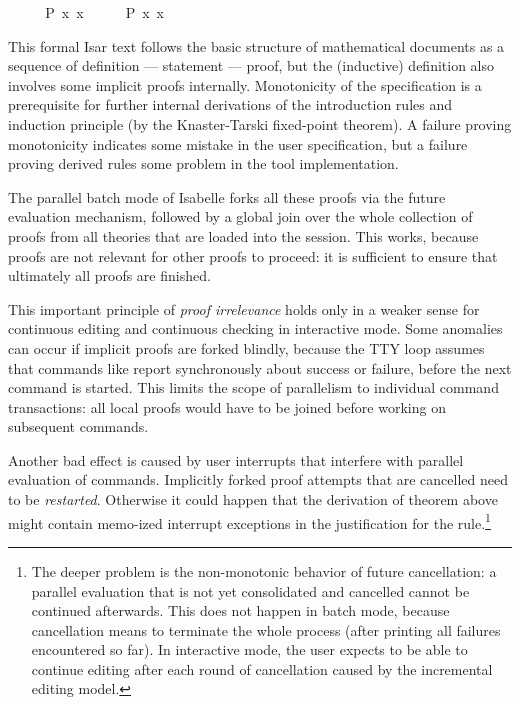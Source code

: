 \begin{isabellebody}
\ \ \isamarkupfalse%
\ \isamarkupfalse%
\ {\isacharbackquoteopen}P\ x\ x\isanewline
\ \ \isamarkupfalse%
\ \isamarkupfalse%
\ {\isachardoublequoteopen}P\ x\ x\ \isamarkupfalse%
\ \ %
\isanewline
{}\isamarkupfalse%
%
\endisatagproof
{\isafoldproof}%
%
\isadelimproof
%
\endisadelimproof
%
\begin{isamarkuptext}%
\noindent This formal Isar text follows the basic structure of
  mathematical documents as a sequence of definition --- statement ---
  proof, but the (inductive) definition also involves some implicit
  proofs internally.  Monotonicity of the specification is a
  prerequisite for further internal derivations of the introduction
  rules and induction principle (by the Knaster-Tarski fixed-point
  theorem).  A failure proving monotonicity indicates some mistake in
  the user specification, but a failure proving derived rules some
  problem in the tool implementation.

  The parallel batch mode of Isabelle forks all these proofs via the
  future evaluation mechanism, followed by a global join over the
  whole collection of proofs from all theories that are loaded into
  the session.  This works, because proofs are not relevant for other
  proofs to proceed: it is sufficient to ensure that ultimately all
  proofs are finished.

  \medskip This important principle of \emph{proof irrelevance}
  holds only in a weaker sense for continuous editing and continuous
  checking in interactive mode.  Some anomalies can occur if implicit
  proofs are forked blindly, because the TTY loop assumes that
  commands like \isa{{\isasymINDUCTIVE}} report synchronously about
  success or failure, before the next command is started.  This limits
  the scope of parallelism to individual command transactions: all
  local proofs would have to be joined before working on subsequent
  commands.

  Another bad effect is caused by user interrupts that interfere with
  parallel evaluation of commands.  Implicitly forked proof attempts
  that are cancelled need to be \emph{restarted}.  Otherwise it could
  happen that the derivation of theorem  above might
  contain memo-ized interrupt exceptions in the justification for the
   rule.\footnote{The deeper problem is the
  non-monotonic behavior of future cancellation: a parallel evaluation
  that is not yet consolidated and cancelled cannot be continued
  afterwards.  This does not happen in batch mode, because
  cancellation means to terminate the whole process (after printing
  all failures encountered so far).  In interactive mode, the user
  expects to be able to continue editing after each round of
  cancellation caused by the incremental editing model.}


\end{isamarkuptext}
\end{isabellebody}
